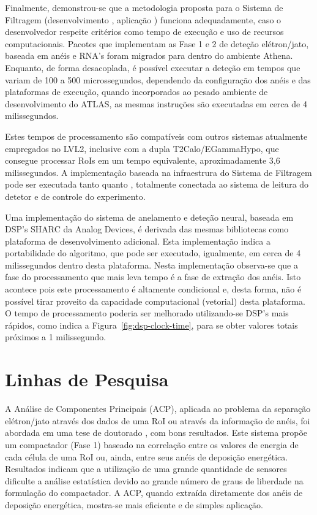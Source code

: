 Finalmente, demonstrou-se que a metodologia proposta para o Sistema de
Filtragem (desenvolvimento , aplicação ) funciona
adequadamente, caso o desenvolvedor respeite critérios como tempo de execução
e uso de recursos computacionais. Pacotes que implementam as Fase 1 e 2 de
deteção elétron/jato, baseada em anéis e RNA's foram migrados para dentro do
ambiente Athena. Enquanto, de forma desacoplada, é possível executar a
deteção em tempos que variam de 100 a 500 microssegundos, dependendo da
configuração dos anéis e das plataformas de execução, quando incorporados ao
pesado ambiente de desenvolvimento do ATLAS, as mesmas instruções são
executadas em cerca de 4 milissegundos.

Estes tempos de processamento são compatíveis com outros sistemas atualmente
empregados no LVL2, inclusive com a dupla T2Calo/EGammaHypo, que consegue
processar RoIs em um tempo equivalente, aproximadamente 3,6 milissegundos. A
implementação baseada na infraestrura do Sistema de Filtragem pode ser
executada tanto  quanto , totalmente conectada ao
sistema de leitura do detetor e de controle do experimento.

Uma implementação do sistema de anelamento e deteção neural, baseada em DSP's
SHARC da Analog Devices, é derivada das mesmas bibliotecas como plataforma de
desenvolvimento adicional. Esta implementação indica a portabilidade do
algoritmo, que pode ser executado, igualmente, em cerca de 4 milissegundos
dentro desta plataforma. Nesta implementação observa-se que a fase do
processamento que mais leva tempo é a fase de extração dos anéis. Isto
acontece pois este processamento é altamente condicional e, desta forma, não é
possível tirar proveito da capacidade computacional (vetorial) desta
plataforma. O tempo de processamento poderia ser melhorado utilizando-se DSP's
mais rápidos, como indica a Figura~\ref{fig:dsp-clock-time}, para se obter
valores totais próximos a 1 milissegundo.

\section{Linhas de Pesquisa}

A Análise de Componentes Principais (ACP), aplicada ao problema da separação
elétron/jato através dos dados de uma RoI ou através da informação de anéis,
foi abordada em uma tese de doutorado \cite{herman}, com bons resultados. Este
sistema propõe um compactador (Fase 1) baseado na correlação entre os valores
de energia de cada célula de uma RoI ou, ainda, entre seus anéis de deposição
energética. Resultados indicam que a utilização de uma grande quantidade de
sensores dificulte a análise estatística devido ao grande número de graus de
liberdade na formulação do compactador. A ACP, quando extraída diretamente dos
anéis de deposição energética, mostra-se mais eficiente e de simples
aplicação.

